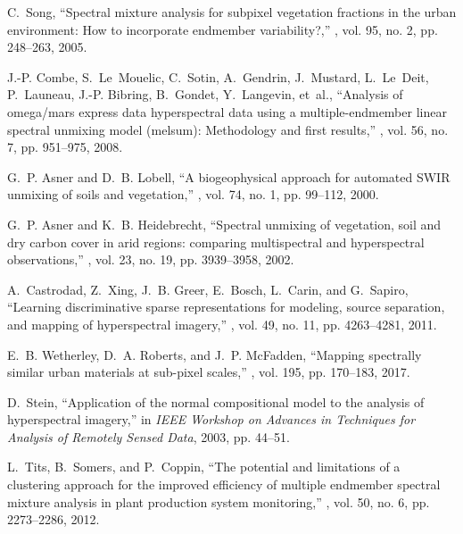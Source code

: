 \documentclass[twocolumn,english]{IEEEtran}
\theoremstyle{plain}
\begin{document}
\begin{thebibliography}{10}
C.~Song,
\newblock ``Spectral mixture analysis for subpixel vegetation fractions in the
  urban environment: How to incorporate endmember variability?,''
, vol. 95, no. 2, pp. 248--263,
  2005.

J.-P. Combe, S.~Le~Mouelic, C.~Sotin, A.~Gendrin, J.~Mustard, L.~Le~Deit,
  P.~Launeau, J.-P. Bibring, B.~Gondet, Y.~Langevin, et~al.,
\newblock ``Analysis of omega/mars express data hyperspectral data using a
  multiple-endmember linear spectral unmixing model (melsum): Methodology and
  first results,''
, vol. 56, no. 7, pp. 951--975,
  2008.

G.~P. Asner and D.~B. Lobell,
\newblock ``A biogeophysical approach for automated {SWIR} unmixing of soils
  and vegetation,''
, vol. 74, no. 1, pp. 99--112,
  2000.

G.~P. Asner and K.~B. Heidebrecht,
\newblock ``Spectral unmixing of vegetation, soil and dry carbon cover in arid
  regions: comparing multispectral and hyperspectral observations,''
, vol. 23, no. 19, pp.
  3939--3958, 2002.

A.~Castrodad, Z.~Xing, J.~B. Greer, E.~Bosch, L.~Carin, and G.~Sapiro,
\newblock ``Learning discriminative sparse representations for modeling, source
  separation, and mapping of hyperspectral imagery,''
, vol. 49,
  no. 11, pp. 4263--4281, 2011.

E.~B. Wetherley, D.~A. Roberts, and J.~P. McFadden,
\newblock ``Mapping spectrally similar urban materials at sub-pixel scales,''
, vol. 195, pp. 170--183, 2017.

D.~Stein,
\newblock ``Application of the normal compositional model to the analysis of
  hyperspectral imagery,''
\newblock in {\em IEEE Workshop on Advances in Techniques for Analysis of
  Remotely Sensed Data}, 2003, pp. 44--51.

L.~Tits, B.~Somers, and P.~Coppin,
\newblock ``The potential and limitations of a clustering approach for the
  improved efficiency of multiple endmember spectral mixture analysis in plant
  production system monitoring,''
, vol. 50,
  no. 6, pp. 2273--2286, 2012.


\end{thebibliography}
\end{document}
